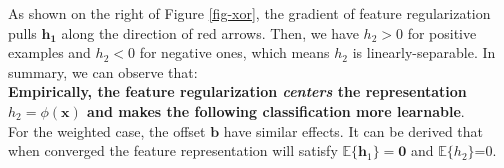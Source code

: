 As shown on the right of Figure \ref{fig-xor}, the gradient of feature regularization
pulls $\mathbf{h_1}$ along the direction of red arrows. Then, we have $h_2>0$ for positive examples and $h_2<0$ for negative ones, which means $h_2$ is linearly-separable. In summary, we can observe that:\\
\textbf{Empirically, the feature regularization \textit{centers} the representation $h_2=\phi(\mathbf{x})$ and makes the following classification more learnable}.\\
For the weighted case, the offset $\mathbf{b}$ have similar effects. It can be derived that when converged the feature representation will satisfy $\mathbb{E}\{\mathbf{h}_1\}=\mathbf{0}$ and $\mathbb{E}\{h_2\}$=0.
